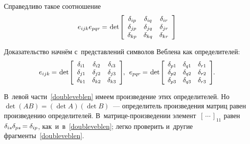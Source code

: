 \begin{otherlanguage}{russian}
Справедливо такое соотношение
\nopagebreak\vspace{.1em}
\begin{equation}\label{doubleveblen}
e_{ijk} e_{pqr} \hspace{-0.1ex} = \hspace{.2ex}
\operatorname{det}\hspace{-0.25ex} \left[\begin{array}{ccc}
\delta_{ip} & \delta_{iq} & \delta_{ir} \\
\delta_{jp} & \delta_{jq} & \delta_{jr} \\
\delta_{kp} & \delta_{kq} & \delta_{kr}
\end{array}\right]
\end{equation}

\noindent Доказательство начнём с~представлений символов Веблена как определителей:
\vspace{-0.5em}\[
e_{ijk} \hspace{-0.1ex} = \hspace{.2ex}
\operatorname{det}\hspace{-0.25ex} \scalebox{0.96}[0.96]{$\left[\begin{array}{ccc}
\delta_{i1} & \delta_{i2} & \delta_{i3} \\
\delta_{j1} & \delta_{j2} & \delta_{j3} \\
\delta_{k1} & \delta_{k2} & \delta_{k3}
\end{array}\right]$} \hspace{-0.25ex}, \:\:
e_{pqr} \hspace{-0.1ex} = \hspace{.2ex}
\operatorname{det}\hspace{-0.25ex} \scalebox{0.96}[0.96]{$\left[\begin{array}{ccc}
\delta_{p1} & \delta_{q1} & \delta_{r1} \\
\delta_{p2} & \delta_{q2} & \delta_{r2} \\
\delta_{p3} & \delta_{q3} & \delta_{r3}
\end{array}\right]$} \hspace{-0.25ex}.
\]

\vspace{-0.16em} \noindent В~левой части~\eqref{doubleveblen} имеем произведение этих определителей. Но~${\operatorname{det} (AB) = (\operatorname{det} A)(\operatorname{det} B)}$~--- определитель произведения матриц равен произведению определителей. В~матрице\hbox{-}произведении элемент~${\left[{\,\cdots\,}\right]}_{11}$ равен~${\delta_{is} \delta_{ps} \hspace{-0.2ex} = \delta_{ip}}$, как~и~в~\eqref{doubleveblen}; легко проверить и~другие фрагменты~\eqref{doubleveblen}.


\end{otherlanguage}
